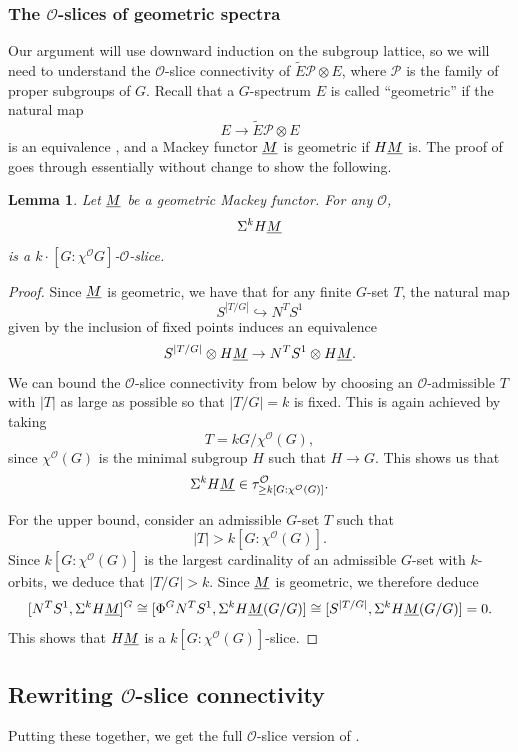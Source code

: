 \documentclass{amsart}
\newcommand{\m}[1]{{\protect\underline{#1}}}
\newcommand{\mM}{\m{M}}
\newcommand{\cc}[1]{\mathcal #1}
\newcommand{\cO}{\cc{O}}
\numberwithin{equation}{section}
\newtheorem{lemma}[theorem]{Lemma}
\theoremstyle{remark}
\theoremstyle{definition}
\begin{document}
\subsubsection*{The \texorpdfstring{\(\cO\)}{O}-slices of geometric spectra}
Our argument will use downward induction on the subgroup lattice, so we will need to understand the \(\cO\)-slice connectivity of \(\tilde{E}\mathcal P\otimes E\), where \(\mathcal P\) is the family of proper subgroups of \(G\).  Recall that a \(G\)-spectrum \(E\) is called ``geometric'' if the natural map
\[
	E\to \tilde{E}\mathcal P\otimes E
\]
is an equivalence \cite[Definition 6.10]{HillSlicePrimer}, and a Mackey functor \(\mM\) is geometric if \(H\mM\) is. The proof of \cite[Theorem 6.7]{HillSlicePrimer} goes through essentially without change to show the following.

\begin{lemma}\label{lem: Slice Connectivity of Geometric Things}%
    Let \(\mM\) be a geometric Mackey functor. For any \(\cO\), 
    \[
        \Sigma^k H\mM
    \]
    is a \(k\cdot [G:\chi^{\cO}G]\)-\(\cO\)-slice.
\end{lemma}
\begin{proof}
    Since \(\mM\) is geometric, we have that for any finite \(G\)-set \(T\), the natural map
   \[
    S^{|T/G|}\hookrightarrow N^T S^1
   \]
   given by the inclusion of fixed points induces an equivalence
   \[
   S^{|T/G|}\otimes H\mM\to N^TS^1\otimes H\mM.
   \]
   We can bound the \(\cO\)-slice connectivity from below by choosing an \(\cO\)-admissible \(T\) with \(|T|\) as large as possible so that \(|T/G|=k\) is fixed. This is again achieved by taking
   \[
   T=k G/\chi^{\cO}(G),
   \]
   since \(\chi^{\cO}(G)\) is the minimal subgroup \(H\) such that \(H\to G\). This shows us that
   \[
   \Sigma^k H\mM\in\tau_{\geq k[G: \chi^{\cO}(G)]}^{\cO}.
   \]
   
   For the upper bound, consider an admissible \(G\)-set \(T\) such that 
   \[
   |T|>k[G:\chi^{\cO}(G)].
   \]
   Since \(k[G:\chi^{\cO}(G)]\) is the largest cardinality of an admissible \(G\)-set with \(k\)-orbits, we deduce that \(|T/G|>k\). Since \(\mM\) is geometric, we therefore deduce
   \[
   [N^TS^1,\Sigma^kH\mM]^G\cong [\Phi^G N^TS^1,\Sigma^k H\mM(G/G)]
   \cong [S^{|T/G|},\Sigma^{k}H\mM(G/G)]=0.
   \]
   This shows that \(H\mM\) is a \(k[G: \chi^{\cO}(G)]\)-slice.
\end{proof}

\subsection{Rewriting \texorpdfstring{\(\cO\)}{O}-slice connectivity}
Putting these together, we get the full \(\cO\)-slice version of \cite[Theorem 2.5]{HillYarnall}. 
\end{document}
